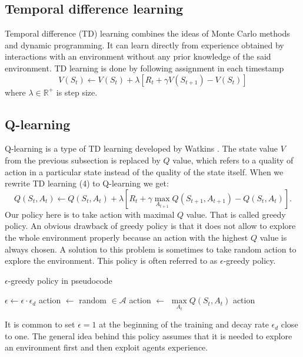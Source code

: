 \subsection{Temporal difference learning}
Temporal difference (TD) learning combines the ideas of Monte Carlo methods and dynamic programming. It can learn directly from experience obtained by interactions with an environment without any prior knowledge of the said environment. TD learning is done by following assignment in each timestamp \cite{sutton2012}
\begin{equation}
V(S_t) \gets V(S_t) + \lambda [R_{t} + \gamma V(S_{t+1}) - V(S_t)]
\end{equation}
where $\lambda \in \mathbb{R}^+$ is step size.

\subsection{Q-learning}
Q-learning is a type of TD learning developed by Watkins \cite{watkins1992}. The state value $V$ from the previous subsection is replaced by $Q$ value, which refers to a quality of action in a particular state instead of the quality of the state itself. When we rewrite TD learning (4) to Q-learning we get:
\begin{equation}
Q(S_t, A_t) \gets Q(S_t, A_t) + \lambda [R_{t} + \gamma \underset{A_{t+1}}{\max} Q(S_{t+1}, A_{t+1}) - Q(S_t, A_t)].
\end{equation}
Our policy here is to take action with maximal $Q$ value. That is called greedy policy. An obvious drawback of greedy policy is that it does not allow to explore the whole environment properly because an action with the highest $Q$ value is always chosen. A solution to this problem is sometimes to take random action to explore the environment. This policy is often referred to as $\epsilon$-greedy policy.

\begin{algorithm}
\caption{$\epsilon$-greedy policy in pseudocode}
\begin{algorithmic}[1]
\State $\epsilon \gets \epsilon \cdot \epsilon_d$
\State action $\gets$ random $\in \mathcal{A}$
\Else 
\State action $\gets$ $\underset{A_t}{\max} Q(S_t, A_t)$
\EndIf
\State \Return action
\EndProcedure
\end{algorithmic}
\end{algorithm}

It is common to set $\epsilon = 1$ at the beginning of the training and decay rate $\epsilon_d$ close to one. The general idea behind this policy assumes that it is needed to explore an environment first and then exploit agents experience.


